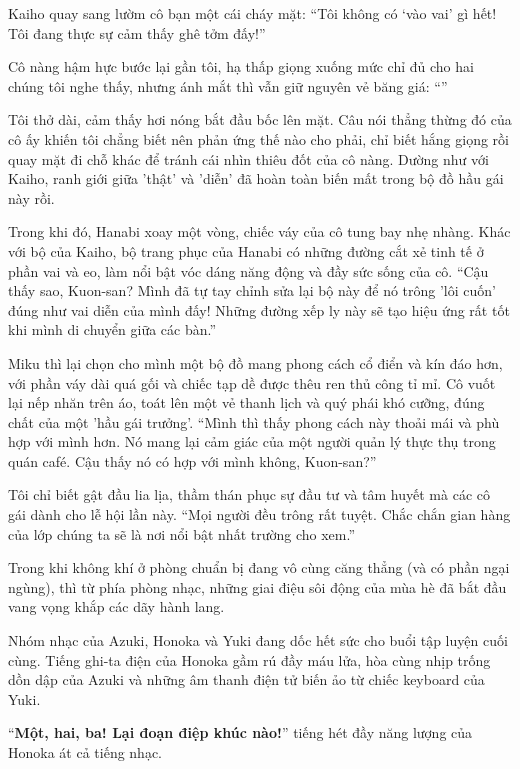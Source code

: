 \documentclass[../main.tex]{subfiles}
\begin{document}
Kaiho quay sang lườm cô bạn một cái cháy mặt: ``Tôi không có `vào vai' gì hết! Tôi đang thực sự cảm thấy ghê tởm đấy!''

Cô nàng hậm hực bước lại gần tôi, hạ thấp giọng xuống mức chỉ đủ cho hai chúng tôi nghe thấy, nhưng ánh mắt thì vẫn giữ nguyên vẻ băng giá: ``''

Tôi thở dài, cảm thấy hơi nóng bắt đầu bốc lên mặt. Câu nói thẳng thừng đó của cô ấy khiến tôi chẳng biết nên phản ứng thế nào cho phải, chỉ biết hắng giọng rồi quay mặt đi chỗ khác để tránh cái nhìn thiêu đốt của cô nàng. Dường như với Kaiho, ranh giới giữa 'thật' và 'diễn' đã hoàn toàn biến mất trong bộ đồ hầu gái này rồi.

Trong khi đó, Hanabi xoay một vòng, chiếc váy của cô tung bay nhẹ nhàng. Khác với bộ của Kaiho, bộ trang phục của Hanabi có những đường cắt xẻ tinh tế ở phần vai và eo, làm nổi bật vóc dáng năng động và đầy sức sống của cô. ``Cậu thấy sao, Kuon-san? Mình đã tự tay chỉnh sửa lại bộ này để nó trông 'lôi cuốn' đúng như vai diễn của mình đấy! Những đường xếp ly này sẽ tạo hiệu ứng rất tốt khi mình di chuyển giữa các bàn.''

Miku thì lại chọn cho mình một bộ đồ mang phong cách cổ điển và kín đáo hơn, với phần váy dài quá gối và chiếc tạp dề được thêu ren thủ công tỉ mỉ. Cô vuốt lại nếp nhăn trên áo, toát lên một vẻ thanh lịch và quý phái khó cưỡng, đúng chất của một 'hầu gái trưởng'. ``Mình thì thấy phong cách này thoải mái và phù hợp với mình hơn. Nó mang lại cảm giác của một người quản lý thực thụ trong quán café. Cậu thấy nó có hợp với mình không, Kuon-san?''

Tôi chỉ biết gật đầu lia lịa, thầm thán phục sự đầu tư và tâm huyết mà các cô gái dành cho lễ hội lần này. ``Mọi người đều trông rất tuyệt. Chắc chắn gian hàng của lớp chúng ta sẽ là nơi nổi bật nhất trường cho xem.''

Trong khi không khí ở phòng chuẩn bị đang vô cùng căng thẳng (và có phần ngại ngùng), thì từ phía phòng nhạc, những giai điệu sôi động của mùa hè đã bắt đầu vang vọng khắp các dãy hành lang.

Nhóm nhạc của Azuki, Honoka và Yuki đang dốc hết sức cho buổi tập luyện cuối cùng. Tiếng ghi-ta điện của Honoka gầm rú đầy máu lửa, hòa cùng nhịp trống dồn dập của Azuki và những âm thanh điện tử biến ảo từ chiếc keyboard của Yuki.

``\textbf{Một, hai, ba! Lại đoạn điệp khúc nào!}'' tiếng hét đầy năng lượng của Honoka át cả tiếng nhạc.
\end{document}

